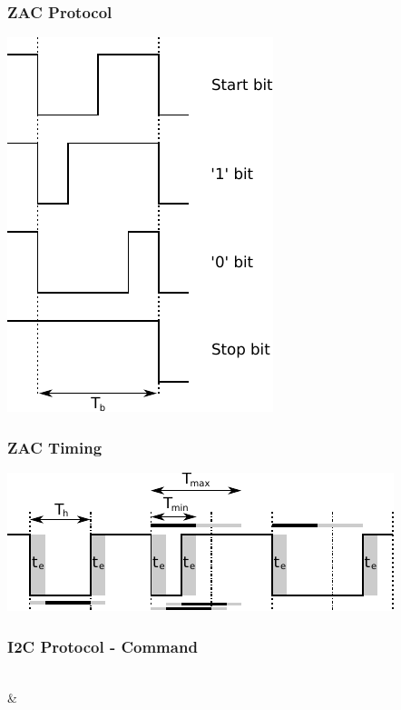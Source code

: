 \documentclass[t]{beamer}
\begin{document}
\begin{frame}[c]
    \frametitle{ZAC Protocol}
  \begin{center}
  	\includegraphics[width=0.4\linewidth]{img/zac_bits.pdf}\\
  \vspace{0.5cm}
  \end{center}
\end{frame}
\begin{frame}[c]
    \frametitle{ZAC Timing}
  \begin{center}
  	\includegraphics[width=0.8\linewidth]{img/zac_timing.pdf}\\
  \vspace{0.5cm}
  \end{center}
\end{frame}
\begin{frame}[c,fragile]
    \frametitle{I2C Protocol - Command}
  \begin{center}
	\begin{bytefield}[endianness=big, bitwidth=2em]{8}
		\\
		 &
		\\
		\\
	\end{bytefield}
  \end{center}
\end{frame}
\end{document}
